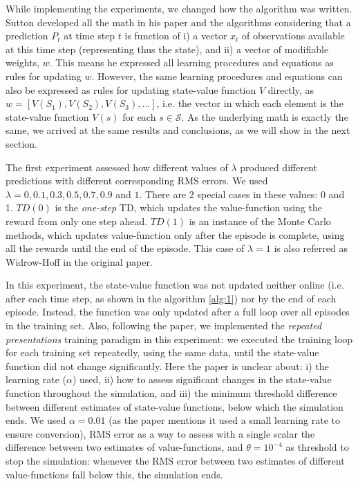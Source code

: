 \documentclass{article}
\begin{document}
    While implementing the experiments, we changed how the algorithm was written.
    Sutton developed all the math in his paper and the algorithms considering that a prediction $P_{t}$ at time step $t$ is function of i) a vector $x_{t}$ of observations available at this time step (representing thus the state), and ii) a vector of modifiable weights, $w$.
    This means he expressed all learning procedures and equations as rules for updating $w$.
    However, the same learning procedures and equations can also be expressed as rules for updating state-value function $V$ directly, as $w = [V(S_{1}), V(S_{2}), V(S_{3}), ...]$, i.e. the vector in which each element is the state-value function $V(s)$ for each $s \in \mathcal{S}$.
    As the underlying math is exactly the same, we arrived at the same results and conclusions, as we will show in the next section.

    The first experiment assessed how different values of $\lambda$ produced different predictions with different corresponding RMS errors.
    We used $\lambda = 0, 0.1, 0.3, 0.5, 0.7, 0.9$ and $1$.
    There are 2 special cases in these values: 0 and 1.
    $TD(0)$ is the \emph{one-step} TD, which updates the value-function using the reward from only one step ahead.
    $TD(1)$ is an instance of the Monte Carlo methods, which updates value-function only after the episode is complete, using all the rewards until the end of the episode.
    This case of $\lambda = 1$ is also referred as Widrow-Hoff in the original paper.

    In this experiment, the state-value function was not updated neither online (i.e. after each time step, as shown in the algorithm \ref{alg:1}) nor by the end of each episode.
    Instead, the function was only updated after a full loop over all episodes in the training set.
    Also, following the paper, we implemented the \emph{repeated presentations} training paradigm in this experiment: we executed the training loop for each training set repeatedly, using the same data, until the state-value function did not change significantly.
    Here the paper is unclear about: i) the learning rate ($\alpha$) used, ii) how to assess significant changes in the state-value function throughout the simulation, and iii) the minimum threshold difference between different estimates of state-value functions, below which the simulation ends.
    We used $\alpha = 0.01$ (as the paper mentions it used a small learning rate to ensure conversion), RMS error as a way to assess with a single scalar the difference between two estimates of value-functions, and $\theta = 10^{-4}$ as threshold to stop the simulation: whenever the RMS error between two estimates of different value-functions fall below this, the simulation ends.
\end{document}
